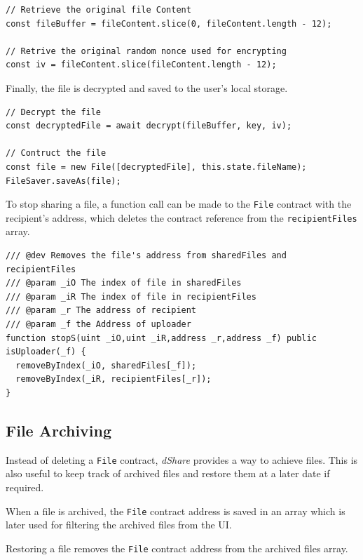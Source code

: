 \documentclass[]{article}
\begin{document}
\begin{verbatim}
// Retrieve the original file Content
const fileBuffer = fileContent.slice(0, fileContent.length - 12);

// Retrive the original random nonce used for encrypting
const iv = fileContent.slice(fileContent.length - 12);
\end{verbatim}

		Finally, the file is decrypted and saved to the user's local storage.
		
\begin{verbatim}
// Decrypt the file
const decryptedFile = await decrypt(fileBuffer, key, iv);

// Contruct the file
const file = new File([decryptedFile], this.state.fileName);
FileSaver.saveAs(file);
\end{verbatim}

		To stop sharing a file, a function call can be made to the \texttt{File} contract with the recipient's address, which deletes the contract reference from the \texttt{recipientFiles} array.
		
\begin{verbatim}
/// @dev Removes the file's address from sharedFiles and recipientFiles
/// @param _iO The index of file in sharedFiles
/// @param _iR The index of file in recipientFiles
/// @param _r The address of recipient
/// @param _f the Address of uploader
function stopS(uint _iO,uint _iR,address _r,address _f) public isUploader(_f) {
  removeByIndex(_iO, sharedFiles[_f]);
  removeByIndex(_iR, recipientFiles[_r]);
}
\end{verbatim}
		
		\newpage
		\subsection{File Archiving}
		Instead of deleting a \texttt{File} contract, \textit{dShare} provides a way to achieve files. This is also useful to keep track of archived files and restore them at a later date if required.
		
		When a file is archived, the \texttt{File} contract address is saved in an array which is later used for filtering the archived files from the UI.
		
		Restoring a file removes the \texttt{File} contract address from the archived files array.
		
\end{document}
